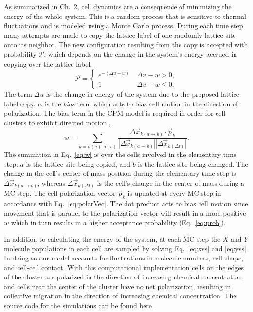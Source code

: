 As summarized in Ch.\ 2, cell dynamics are a consequence of minimizing the energy of the whole system. This is a random process that is sensitive to thermal fluctuations and is modeled using a Monte Carlo process. During each time step many attempts are made to copy the lattice label of one randomly lattice site onto its neighbor. The new configuration resulting from the copy is accepted with probability $\mathcal{P}$, which depends on the change in the system's energy accrued in copying over the lattice label,
\begin{equation} \label{eq:prob}
    \mathcal{P} =
    \begin{cases}
        e^{-\left( \Delta u - w \right)} &\ \Delta u - w > 0 , \\
        1 &\ \Delta u - w \leq 0 .
    \end{cases}
\end{equation}
The term $\Delta u$ is the change in energy of the system due to the proposed lattice label copy. $w$ is the \textit{bias} term which acts to bias cell motion in the direction of polarization. The bias term in the CPM model is required in order for cell clusters to exhibit directed motion \cite{szabo2010collective},
\begin{equation} \label{eq:w}
    w = \sum_{k=\sigma(a),\sigma(b)} \frac{\Delta\vec{x}_{k(a \to b)} \cdot \vec{p}_k}{ |\Delta\vec{x}_{k(a \to b)}| |\Delta\vec{x}_{k(\Delta t)}|}.
\end{equation}
The summation in Eq.\ \ref{eq:w} is over the cells involved in the elementary time step: $a$ is the lattice site being copied, and $b$ is the lattice site being changed. The change in the cell's center of mass position during the elementary time step is $\Delta\vec{x}_{k(a \to b)}$, whereas $\Delta\vec{x}_{k(\Delta t)}$ is the cell's change in the center of mass during a MC step. The cell polarization vector $\vec{p}_k$ is updated at every MC step in accordance with Eq.\ \ref{eq:polarVec}. The dot product acts to bias cell motion since movement that is parallel to the polarization vector will result in a more positive $w$ which in turn results in a higher acceptance probability (Eq.\ \ref{eq:prob}).

In addition to calculating the energy of the system, at each MC step the $X$ and $Y$ molecule populations in each cell are sampled by solving Eq.\ \ref{eq:xss} and \ref{eq:yss}. In doing so our model accounts for fluctuations in molecule numbers, cell shape, and cell-cell contact. With this computational implementation cells on the edges of the cluster are polarized in the direction of increasing chemical concentration, and cells near the center of the cluster have no net polarization, resulting in collective migration in the direction of increasing chemical concentration. The source code for the simulations can be found here \cite{ch4code}.


